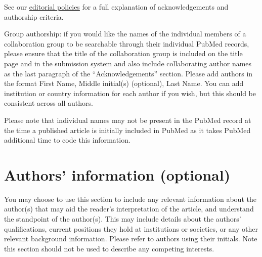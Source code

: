 \documentclass[a4paper,alpha-refs]{aejstyles}
\begin{document}
See our \href{https://academic.oup.com/Astronomy Education Journal/pages/editorial_policies_and_reporting_standards}{editorial policies} for a full explanation of acknowledgements and authorship criteria.

Group authorship: if you would like the names of the individual members of a collaboration group to be searchable through their individual PubMed records, please ensure that the title of the collaboration group is included on the title page and in the submission system and also include collaborating author names as the last paragraph of the “Acknowledgements” section. Please add authors in the format First Name, Middle initial(s) (optional), Last Name. You can add institution or country information for each author if you wish, but this should be consistent across all authors.

Please note that individual names may not be present in the PubMed record at the time a published article is initially included in PubMed as it takes PubMed additional time to code this information.

\section{Authors' information (optional)}

You may choose to use this section to include any relevant information about the author(s) that may aid the reader's interpretation of the article, and understand the standpoint of the author(s). This may include details about the authors' qualifications, current positions they hold at institutions or societies, or any other relevant background information. Please refer to authors using their initials. Note this section should not be used to describe any competing interests.




\end{document}
